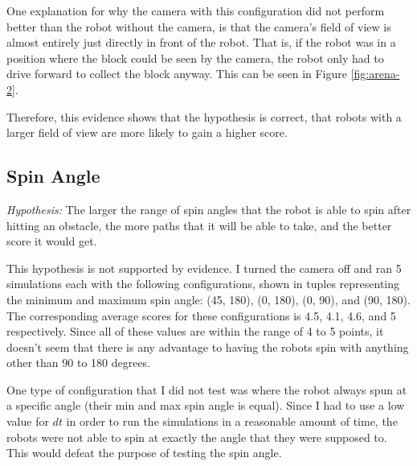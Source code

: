 \documentclass[12pt]{article}
\begin{document}
One explanation for why the camera with this configuration did not perform better than the robot without the camera, is that the camera's field of view is almost entirely just directly in front of the robot. That is, if the robot was in a position where the block could be seen by the camera, the robot only had to drive forward to collect the block anyway. This can be seen in Figure \ref{fig:arena-2}.

Therefore, this evidence shows that the hypothesis is correct, that robots with a larger field of view are more likely to gain a higher score.

\subsection{Spin Angle}
\textit{Hypothesis:} The larger the range of spin angles that the robot is able to spin after hitting an obstacle, the more paths that it will be able to take, and the better score it would get. 

This hypothesis is not supported by evidence. I turned the camera off and ran 5 simulations each with the following configurations, shown in tuples representing the minimum and maximum spin angle: (45\degree, 180\degree), (0\degree, 180\degree), (0\degree, 90\degree), and (90\degree, 180\degree). The corresponding average scores for these configurations is 4.5, 4.1, 4.6, and 5 respectively. Since all of these values are within the range of 4 to 5 points, it doesn't seem that there is any advantage to having the robots spin with anything other than 90 to 180 degrees.

One type of configuration that I did not test was where the robot always spun at a specific angle (their min and max spin angle is equal). Since I had to use a low value for $dt$ in order to run the simulations in a reasonable amount of time, the robots were not able to spin at exactly the angle that they were supposed to. This would defeat the purpose of testing the spin angle.
\end{document}

